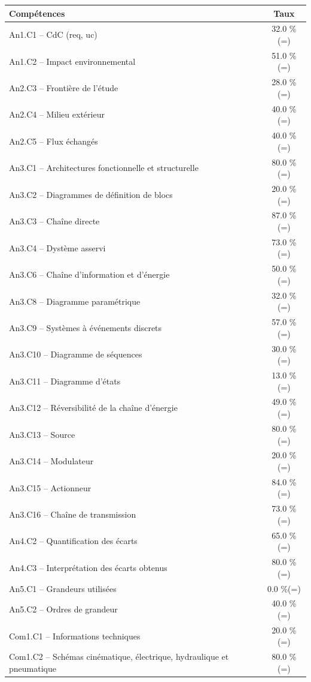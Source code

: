 \footnotesize 
\begin{center} 
\begin{tabular}{|p{.7\linewidth}|c|} 
\hline 
Compétences  & Taux \\ \hline \hline 
An1.C1 -- CdC (req, uc)&32.0 \%(=)\\ \hline 
An1.C2 -- Impact environnemental&51.0 \%(=)\\ \hline 
An2.C3 -- Frontière de l’étude&28.0 \%(=)\\ \hline 
An2.C4 -- Milieu extérieur&40.0 \%(=)\\ \hline 
An2.C5 -- Flux échangés&40.0 \%(=)\\ \hline 
An3.C1 -- Architectures fonctionnelle et structurelle&80.0 \%(=)\\ \hline 
An3.C2 -- Diagrammes de définition de blocs&20.0 \%(=)\\ \hline 
An3.C3 -- Chaîne directe&87.0 \%(=)\\ \hline 
An3.C4 -- Dystème asservi&73.0 \%(=)\\ \hline 
An3.C6 -- Chaîne d’information et d'énergie&50.0 \%(=)\\ \hline 
An3.C8 -- Diagramme paramétrique&32.0 \%(=)\\ \hline 
An3.C9 -- Systèmes à événements discrets&57.0 \%(=)\\ \hline 
An3.C10 -- Diagramme de séquences&30.0 \%(=)\\ \hline 
An3.C11 -- Diagramme d’états&13.0 \%(=)\\ \hline 
An3.C12 -- Réversibilité de la chaîne d’énergie&49.0 \%(=)\\ \hline 
An3.C13 -- Source&80.0 \%(=)\\ \hline 
An3.C14 -- Modulateur&20.0 \%(=)\\ \hline 
An3.C15 -- Actionneur&84.0 \%(=)\\ \hline 
An3.C16 -- Chaîne de transmission&73.0 \%(=)\\ \hline 
An4.C2 -- Quantification des écarts&65.0 \%(=)\\ \hline 
An4.C3 -- Interprétation des écarts obtenus&80.0 \%(=)\\ \hline 
An5.C1 -- Grandeurs utilisées &0.0 \%(=)\\ \hline 
An5.C2 -- Ordres de grandeur&40.0 \%(=)\\ \hline 
Com1.C1 -- Informations techniques&20.0 \%(=)\\ \hline 
Com1.C2 -- Schémas cinématique, électrique, hydraulique et pneumatique&80.0 \%(=)\\ \hline 

\end{tabular}
\end{center}

